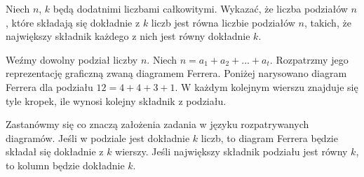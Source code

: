 \noindent
Niech $n$, $k$ będą dodatnimi liczbami całkowitymi. Wykazać, że liczba podziałów $n$, które składają się dokładnie z $k$ liczb jest równa liczbie podziałów $n$, takich, że największy składnik każdego z nich jest równy dokładnie $k$.

\vspace{5px}


\vspace{5px}

\noindent
Weźmy dowolny podział liczby $n$. Niech $n = a_1 + a_2 + ... + a_t$. Rozpatrzmy jego reprezentację graficzną zwaną diagramem Ferrera.
Poniżej narysowano diagram Ferrera dla podziału $12 = 4 + 4 + 3 + 1$.
W każdym kolejnym wierszu znajduje się tyle kropek, ile wynosi kolejny składnik z podziału. 

\begin{center}
\end{center}

\noindent
Zastanówmy się co znaczą założenia zadania w języku rozpatrywanych diagramów.
Jeśli w podziale jest dokładnie $k$ liczb, to diagram Ferrera będzie składał się dokładnie z $k$ wierszy. Jeśli  największy składnik podziału jest równy $k$, to kolumn będzie dokładnie $k$.

